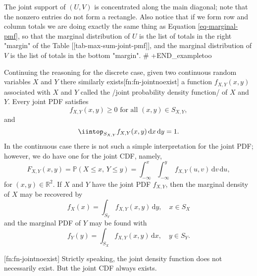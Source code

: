 The joint support of \((U,V)\) is concentrated along the main
diagonal; note that the nonzero entries do not form a rectangle. Also
notice that if we form row and column totals we are doing exactly the
same thing as Equation \eqref{eq-marginal-pmf}, so that the marginal
distribution of \(U\) is the list of totals in the right "margin" of
the Table [[tab-max-sum-joint-pmf]], and the marginal distribution of \(V\) is the
list of totals in the bottom "margin".
# +END_exampletoo


Continuing the reasoning for the discrete case, given two continuous
random variables \(X\) and \(Y\) there similarly
exists[fn:fn-jointnoexist] a function \(f_{X,Y}(x,y)\) associated with
\(X\) and \(Y\) called the /joint probability density function/ of
\(X\) and \(Y\). Every joint PDF satisfies
\begin{equation}
f_{X,Y}(x,y)\geq0\mbox{ for all }(x,y)\in S_{X,Y},
\end{equation}
and
\begin{equation}
\iintop_{S_{X,Y}}f_{X,Y}(x,y)\,\mathrm{d} x\,\mathrm{d} y=1.
\end{equation}
In the continuous case there is not such a simple interpretation for
the joint PDF; however, we do have one for the joint CDF, namely, \[
F_{X,Y}(x,y)=\mathbb{P}(X\leq x,\, Y\leq
y)=\int_{-\infty}^{x}\int_{-\infty}^{y}f_{X,Y}(u,v)\,\mathrm{d}
v\,\mathrm{d} u, \] for \((x,y)\in\mathbb{R}^{2}\). If \(X\) and \(Y\)
have the joint PDF \(f_{X,Y}\), then the marginal density of \(X\) may
be recovered by
\begin{equation}
f_{X}(x)=\int_{S_{Y}}f_{X,Y}(x,y)\,\mathrm{d} y,\quad x \in S_{X}
\end{equation}
and the marginal PDF of \(Y\) may be found with
\begin{equation}
f_{Y}(y)=\int_{S_{X}}f_{X,Y}(x,y)\,\mathrm{d} x, \quad y \in S_{Y}.
\end{equation}

[fn:fn-jointnoexist] Strictly speaking, the joint density function
does not necessarily exist. But the joint CDF always exists.

